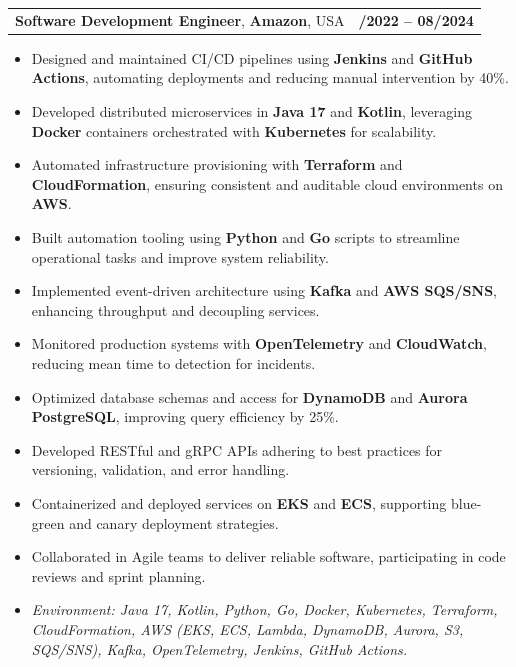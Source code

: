 \documentclass[letterpaper,11pt]{article}
\makeatletter
\newcommand{\resumeItem}[1]{
  \item\footnotesize{
    {#1 \vspace{-2pt}}
  }
}
\newcommand{\resumeSubheading}[4]{
  \vspace{-2pt}\item
    \begin{tabular*}{1.0\textwidth}[t]{l@{\extracolsep{\fill}}r}
      \textbf{\fontsize{10pt}{14pt}\selectfont #3}, \textbf{\fontsize{10pt}{14pt}\selectfont #1}, \fontsize{10pt}{14pt}\selectfont #4 & \textbf{\fontsize{10pt}{14pt}\selectfont #2} \\
    \end{tabular*}\vspace{-7pt}
}
\newcommand{\resumeItemListStart}{\begin{itemize}[leftmargin=*]}
\newcommand{\resumeItemListEnd}{\end{itemize}\vspace{-5pt}}
\makeatother
\begin{document}
\resumeSubheading
{Amazon}{10/2022 -- 08/2024}
{Software Development Engineer}{USA}
\resumeItemListStart
  \resumeItem{Designed and maintained CI/CD pipelines using \textbf{Jenkins} and \textbf{GitHub Actions}, automating deployments and reducing manual intervention by 40\%.}
  \resumeItem{Developed distributed microservices in \textbf{Java 17} and \textbf{Kotlin}, leveraging \textbf{Docker} containers orchestrated with \textbf{Kubernetes} for scalability.}
  \resumeItem{Automated infrastructure provisioning with \textbf{Terraform} and \textbf{CloudFormation}, ensuring consistent and auditable cloud environments on \textbf{AWS}.}
  \resumeItem{Built automation tooling using \textbf{Python} and \textbf{Go} scripts to streamline operational tasks and improve system reliability.}
  \resumeItem{Implemented event-driven architecture using \textbf{Kafka} and \textbf{AWS SQS/SNS}, enhancing throughput and decoupling services.}
  \resumeItem{Monitored production systems with \textbf{OpenTelemetry} and \textbf{CloudWatch}, reducing mean time to detection for incidents.}
  \resumeItem{Optimized database schemas and access for \textbf{DynamoDB} and \textbf{Aurora PostgreSQL}, improving query efficiency by 25\%.}
  \resumeItem{Developed RESTful and gRPC APIs adhering to best practices for versioning, validation, and error handling.}
  \resumeItem{Containerized and deployed services on \textbf{EKS} and \textbf{ECS}, supporting blue-green and canary deployment strategies.}
  \resumeItem{Collaborated in Agile teams to deliver reliable software, participating in code reviews and sprint planning.}
  \resumeItem{\textit{Environment: Java 17, Kotlin, Python, Go, Docker, Kubernetes, Terraform, CloudFormation, AWS (EKS, ECS, Lambda, DynamoDB, Aurora, S3, SQS/SNS), Kafka, OpenTelemetry, Jenkins, GitHub Actions.}}
\resumeItemListEnd
\end{document}
